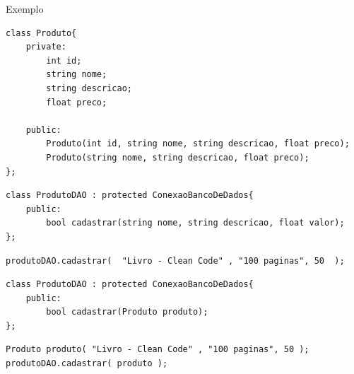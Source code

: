 \begin{frame}
	\Huge Exemplo
\end{frame}

\begin{frame}[fragile]

	\begin{listing}[H]
		\begin{verbatim}
class Produto{
	private:
		int id;
		string nome;
		string descricao;
		float preco;

	public:
		Produto(int id, string nome, string descricao, float preco);
		Produto(string nome, string descricao, float preco);
};
		\end{verbatim}
	\end{listing}

\end{frame}

\begin{frame}[fragile]

	\begin{listing}[H]
		\begin{verbatim}
class ProdutoDAO : protected ConexaoBancoDeDados{
	public:
		bool cadastrar(string nome, string descricao, float valor);
};
		\end{verbatim}
	\end{listing}

	\begin{listing}[H]
		\begin{verbatim}
produtoDAO.cadastrar(  "Livro - Clean Code" , "100 paginas", 50  );
		\end{verbatim}
	\end{listing}

\end{frame}

\begin{frame}[fragile]
	\begin{listing}[H]
		\begin{verbatim}
class ProdutoDAO : protected ConexaoBancoDeDados{
	public:
		bool cadastrar(Produto produto);
};
		\end{verbatim}
	\end{listing}

	\begin{listing}[H]
		\begin{verbatim}
Produto produto( "Livro - Clean Code" , "100 paginas", 50 );
produtoDAO.cadastrar( produto );
		\end{verbatim}
	\end{listing}
\end{frame}

